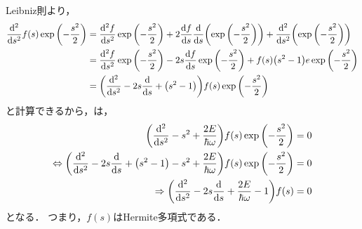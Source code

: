 \documentclass{report}
\begin{document}
    Leibniz則より，
    \begin{align}
      \dv[2]{s}f(s)\exp\qty(-\frac{s^2}{2}) &= \dv[2]{f}{s}\exp\qty(-\frac{s^2}{2}) + 2\dv{f}{s}\dv{s}\qty(\exp\qty(-\frac{s^2}{2})) + \dv[2]{s}\qty(\exp\qty(-\frac{s^2}{2})) \\ 
      &= \dv[2]{f}{s}\exp\qty(-\frac{s^2}{2}) - 2s\dv{f}{s}\exp\qty(-\frac{s^2}{2}) + f(s)\qty(s^2 - 1)e\exp\qty(-\frac{s^2}{2}) \\ 
      &= \qty(\dv[2]{s} - 2s\dv{s} + \qty(s^2 - 1))f(s)\exp\qty(-\frac{s^2}{2})
    \end{align}
    と計算できるから，は，
    \begin{align}
      \qty(\dv[2]{s} - s^2 + \frac{2E}{\hbar\omega})f(s)\exp\qty(-\frac{s^2}{2}) &= 0 \\ 
      \Leftrightarrow \qty(\dv[2]{s} - 2s\dv{s} + \qty(s^2 - 1) - s^2 + \frac{2E}{\hbar\omega})f(s)\exp\qty(-\frac{s^2}{2}) &= 0 \\ 
      \Rightarrow \qty(\dv[2]{s} - 2s\dv{s} + \frac{2E}{\hbar\omega} - 1)f(s) &= 0
    \end{align}
    となる．
    つまり，$f(s)$はHermite多項式である．
\end{document}
